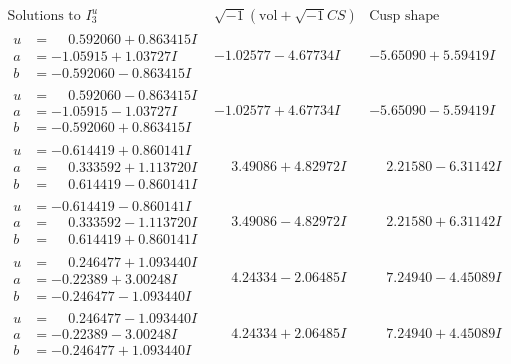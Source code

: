 \documentclass[1p]{elsarticle_modified}
\theoremstyle{definition}
\newcommand{\I}{\sqrt{-1}}
\begin{document}
$$\begin{array}{c|c|c}  
\text{Solutions to }I^u_{3}& \I (\text{vol} + \sqrt{-1}CS) & \text{Cusp shape}\\
 \hline 
\begin{aligned}
u &= \phantom{-}0.592060 + 0.863415 I \\
a &= -1.05915 + 1.03727 I \\
b &= -0.592060 - 0.863415 I\end{aligned}
 & -1.02577 - 4.67734 I & -5.65090 + 5.59419 I \\ \hline\begin{aligned}
u &= \phantom{-}0.592060 - 0.863415 I \\
a &= -1.05915 - 1.03727 I \\
b &= -0.592060 + 0.863415 I\end{aligned}
 & -1.02577 + 4.67734 I & -5.65090 - 5.59419 I \\ \hline\begin{aligned}
u &= -0.614419 + 0.860141 I \\
a &= \phantom{-}0.333592 + 1.113720 I \\
b &= \phantom{-}0.614419 - 0.860141 I\end{aligned}
 & \phantom{-}3.49086 + 4.82972 I & \phantom{-}2.21580 - 6.31142 I \\ \hline\begin{aligned}
u &= -0.614419 - 0.860141 I \\
a &= \phantom{-}0.333592 - 1.113720 I \\
b &= \phantom{-}0.614419 + 0.860141 I\end{aligned}
 & \phantom{-}3.49086 - 4.82972 I & \phantom{-}2.21580 + 6.31142 I \\ \hline\begin{aligned}
u &= \phantom{-}0.246477 + 1.093440 I \\
a &= -0.22389 + 3.00248 I \\
b &= -0.246477 - 1.093440 I\end{aligned}
 & \phantom{-}4.24334 - 2.06485 I & \phantom{-}7.24940 - 4.45089 I \\ \hline\begin{aligned}
u &= \phantom{-}0.246477 - 1.093440 I \\
a &= -0.22389 - 3.00248 I \\
b &= -0.246477 + 1.093440 I\end{aligned}
 & \phantom{-}4.24334 + 2.06485 I & \phantom{-}7.24940 + 4.45089 I \\ \hline\begin{aligned}

\end{aligned}
\end{array}$$
\end{document}
